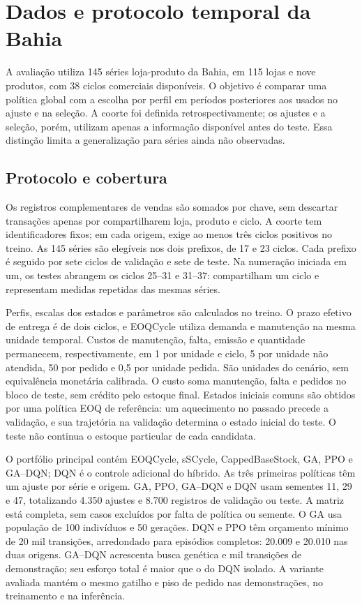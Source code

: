 \section{Dados e protocolo temporal da Bahia}
\label{sec:ba2026_methods}

A avaliação utiliza 145 séries loja-produto da Bahia, em 115 lojas e nove produtos, com 38 ciclos comerciais disponíveis. O objetivo é comparar uma política global com a escolha por perfil em períodos posteriores aos usados no ajuste e na seleção. A coorte foi definida retrospectivamente; os ajustes e a seleção, porém, utilizam apenas a informação disponível antes do teste. Essa distinção limita a generalização para séries ainda não observadas.

\subsection{Protocolo e cobertura}

Os registros complementares de vendas são somados por chave, sem descartar transações apenas por compartilharem loja, produto e ciclo. A coorte tem identificadores fixos; em cada origem, exige ao menos três ciclos positivos no treino. As 145 séries são elegíveis nos dois prefixos, de 17 e 23 ciclos. Cada prefixo é seguido por sete ciclos de validação e sete de teste. Na numeração iniciada em um, os testes abrangem os ciclos 25--31 e 31--37: compartilham um ciclo e representam medidas repetidas das mesmas séries.

Perfis, escalas dos estados e parâmetros são calculados no treino. O prazo efetivo de entrega é de dois ciclos, e EOQCycle utiliza demanda e manutenção na mesma unidade temporal. Custos de manutenção, falta, emissão e quantidade permanecem, respectivamente, em 1 por unidade e ciclo, 5 por unidade não atendida, 50 por pedido e 0,5 por unidade pedida. São unidades do cenário, sem equivalência monetária calibrada. O custo soma manutenção, falta e pedidos no bloco de teste, sem crédito pelo estoque final. Estados iniciais comuns são obtidos por uma política EOQ de referência: um aquecimento no passado precede a validação, e sua trajetória na validação determina o estado inicial do teste. O teste não continua o estoque particular de cada candidata.

O portfólio principal contém EOQCycle, sSCycle, CappedBaseStock, GA, PPO e GA--DQN; DQN é o controle adicional do híbrido. As três primeiras políticas têm um ajuste por série e origem. GA, PPO, GA--DQN e DQN usam sementes 11, 29 e 47, totalizando 4.350 ajustes e 8.700 registros de validação ou teste. A matriz está completa, sem casos excluídos por falta de política ou semente. O GA usa população de 100 indivíduos e 50 gerações. DQN e PPO têm orçamento mínimo de 20 mil transições, arredondado para episódios completos: 20.009 e 20.010 nas duas origens. GA--DQN acrescenta busca genética e mil transições de demonstração; seu esforço total é maior que o do DQN isolado. A variante avaliada mantém o mesmo gatilho e piso de pedido nas demonstrações, no treinamento e na inferência.

